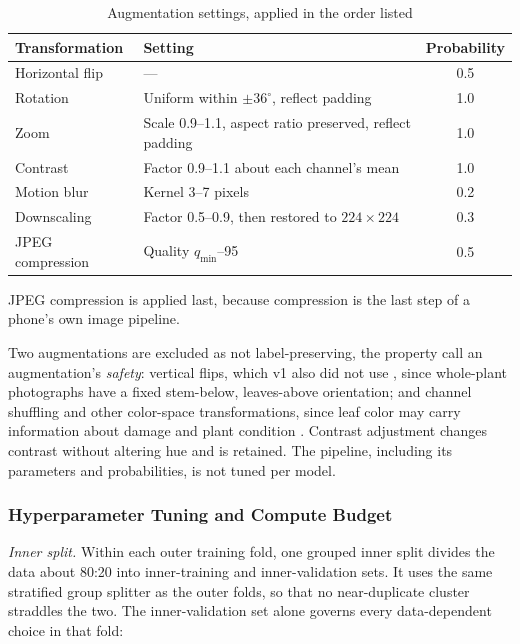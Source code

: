 \documentclass{icsthesis}
\begin{document}
\begin{mainmatter}
					\begin{table}[htbp]
					\vspace{4ex}
					\centering
						\caption{Augmentation settings, applied in the order listed}
						\label{tab:augment}
						\begin{tabular}{lp{7.5cm}c}
						\hline
						\hline
						Transformation & Setting & Probability \\ \hline
						Horizontal flip & --- & 0.5 \\
						Rotation & Uniform within $\pm 36^{\circ}$, reflect padding & 1.0 \\
						Zoom & Scale 0.9--1.1, aspect ratio preserved, reflect padding & 1.0 \\
						Contrast & Factor 0.9--1.1 about each channel's mean & 1.0 \\
						Motion blur & Kernel 3--7 pixels & 0.2 \\
						Downscaling & Factor 0.5--0.9, then restored to $224 \times 224$ & 0.3 \\
						JPEG compression & Quality $q_{\min}$--95 & 0.5 \\ \hline\hline
						\end{tabular}
					\vspace{4ex}
					\end{table}

					JPEG compression is applied last, because compression is the last step of a
					phone's own image pipeline.

				Two augmentations are excluded as not label-preserving, the property
				\citet{shorten2019} call an augmentation's \textit{safety}: vertical
				flips, which v1 also did not use \citep{casasola2026}, since whole-plant
				photographs have a fixed stem-below, leaves-above orientation; and
				channel shuffling and other color-space transformations, since leaf
				color may carry information about damage and plant condition
				\citep{shorten2019}. Contrast adjustment changes contrast without
				altering hue and is retained. The pipeline, including its parameters and
				probabilities, is not tuned per model.

				\subsubsection{Hyperparameter Tuning and Compute Budget}\label{sec:tuning}

					\textit{Inner split.} Within each outer training fold, one grouped inner split
					divides the data about 80:20 into inner-training and inner-validation sets. It
					uses the same stratified group splitter as the outer folds, so that no
					near-duplicate cluster straddles the two. The inner-validation set alone governs
					every data-dependent choice in that fold:


\end{mainmatter}
\end{document}
